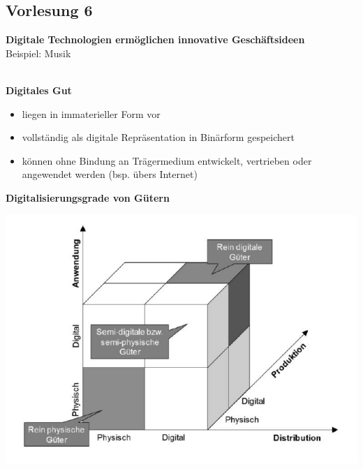 \documentclass[a4]{scrartcl}
\begin{document}
\subsection*{Vorlesung 6}

\textbf{Digitale Technologien ermöglichen innovative Geschäftsideen} \\
Beispiel: Musik
\\ \\

\vspace*{2em}

\textbf{Digitales Gut} 
\begin{itemize}
\item liegen in immaterieller Form vor
\item vollständig als digitale Repräsentation in Binärform gespeichert
\item können ohne Bindung an Trägermedium entwickelt, vertrieben oder angewendet werden (bsp. übers Internet)
\end{itemize}

\textbf{Digitalisierungsgrade von Gütern}

\includegraphics[scale=0.35]{wuerfel.png}
\end{document}
